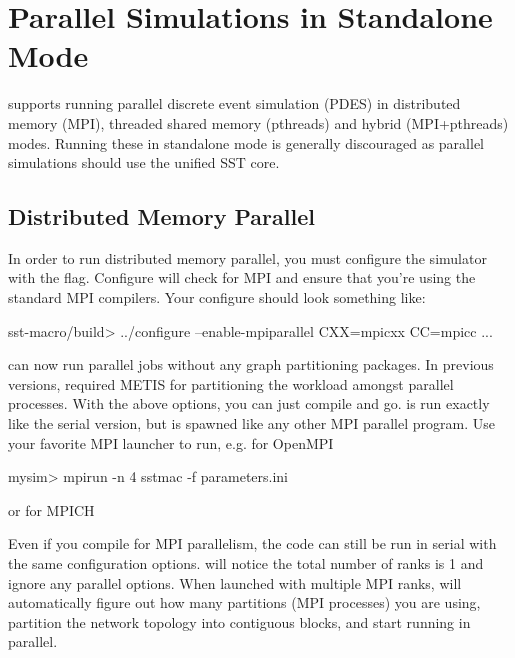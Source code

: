 \section{Parallel Simulations in Standalone Mode}
\label{sec:PDES}

\sstmacro supports running parallel discrete event simulation (PDES) in distributed memory (MPI), threaded shared memory (pthreads) and hybrid (MPI+pthreads) modes.  Running these in standalone mode is generally discouraged as parallel simulations should use the unified SST core.

\subsection{Distributed Memory Parallel}
\label{subsec:mpiparallel}
In order to run distributed memory parallel, you must configure the simulator with the  flag.
Configure will check for MPI and ensure that you're using
the standard MPI compilers.  Your configure should look something like:

\begin{ShellCmd}
sst-macro/build> ../configure --enable-mpiparallel CXX=mpicxx CC=mpicc ...
\end{ShellCmd}

\sstmacro can now run parallel jobs without any graph partitioning packages.
In previous versions, \sstmacro required METIS for partitioning the workload amongst parallel processes.
With the above options, you can just compile and go.
\sstmacro is run exactly like the serial version, but is spawned like any other MPI parallel program.
Use your favorite MPI launcher to run, e.g. for OpenMPI

\begin{ShellCmd}
mysim> mpirun -n 4 sstmac -f parameters.ini
\end{ShellCmd}

or for MPICH


Even if you compile for MPI parallelism, the code can still be run in serial with the same configuration options.
\sstmacro will notice the total number of ranks is 1 and ignore any parallel options.
When launched with multiple MPI ranks, \sstmacro will automatically figure out how many partitions (MPI processes) 
you are using, partition the network topology into contiguous blocks, and start running in parallel.   

